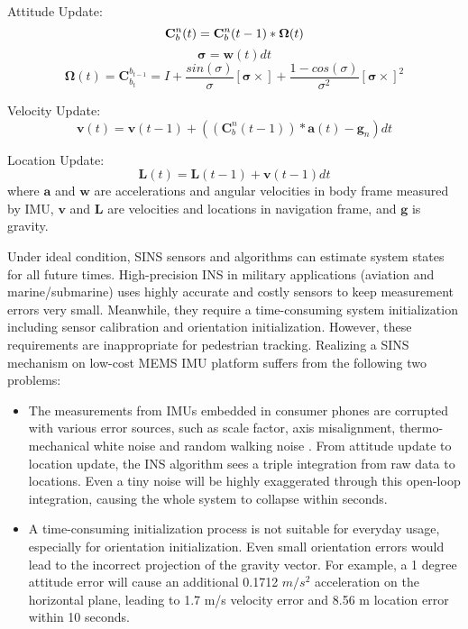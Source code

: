 \documentclass[letterpaper]{article}
\begin{document}
	Attitude Update:
	\begin{equation}	
    	\label{eq:att_update1}
    	\mathbf{C}_b^n(t)=\mathbf{C}_b^n(t-1)*\mathbf{\Omega}(t) \\      
    \end{equation}
    \begin{equation}
    	\label{eq:att_update2}
    	\mathbf{\sigma}=\mathbf{w}(t)dt
    \end{equation}
	\begin{equation}
    	\label{eq:att_update3}
		\mathbf{\Omega}(t)=\mathbf{C}_{b_t}^{b_{t-1}}=I+\frac{sin(\sigma)}{\sigma}[\mathbf{\sigma}\times]+\frac{1-cos(\sigma)}{\sigma^2}[\mathbf{\sigma}\times]^2
	\end{equation}
    
	Velocity Update:
	\begin{equation}
    	\label{eq:vel_update}
    	\mathbf{v}(t)=\mathbf{v}(t-1)+((\mathbf{C}_b^n(t-1))*\mathbf{a}(t)-\mathbf{g}_n)dt        
	\end{equation}

	Location Update:
	\begin{equation}
    	\label{eq:loc_update}
    	\mathbf{L}(t)=\mathbf{L}(t-1)+\mathbf{v}(t-1)dt    
    \end{equation}
where $\mathbf{a}$ and $\mathbf{w}$ are accelerations and angular velocities in body frame measured by IMU, $\mathbf{v}$ and $\mathbf{L}$ are velocities and locations in navigation frame, and $\mathbf{g}$ is gravity.
    
 	Under ideal condition, SINS sensors and algorithms can estimate system states for all future times. High-precision INS in military applications (aviation and marine/submarine) uses highly accurate and costly sensors to keep measurement errors very small. Meanwhile, they require a time-consuming system initialization including sensor calibration and orientation initialization. However, these requirements are inappropriate for pedestrian tracking. Realizing a SINS mechanism on low-cost MEMS IMU platform suffers from the following two problems: 
    
\begin{itemize}
\item The measurements from IMUs embedded in consumer phones are corrupted with various error sources, such as scale factor, axis misalignment, thermo-mechanical white noise and random walking noise \cite{NaserEl-SheimyHaiyingHou2008}. From attitude update to location update, the INS algorithm sees a triple integration from raw data to locations. Even a tiny noise will be highly exaggerated through this open-loop integration, causing the whole system to collapse within seconds.
\item A time-consuming initialization process is not suitable for everyday usage, especially for orientation initialization. Even small orientation errors would lead to the incorrect projection of the gravity vector. For example, a 1 degree attitude error will cause an additional 0.1712 $m/s^2$ acceleration on the horizontal plane, leading to 1.7 m/s velocity error and 8.56 m location error within 10 seconds.
\end{itemize}
\end{document}

